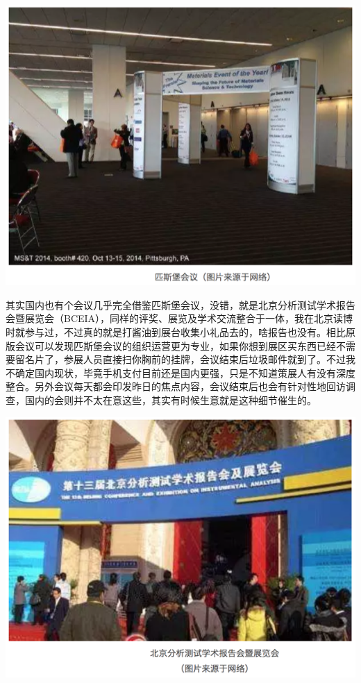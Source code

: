 \documentclass[]{book}
\begin{document}
\includegraphics[width=8.33in]{images/pittcon2}

其实国内也有个会议几乎完全借鉴匹斯堡会议，没错，就是北京分析测试学术报告会暨展览会（BCEIA），同样的评奖、展览及学术交流整合于一体，我在北京读博时就参与过，不过真的就是打酱油到展台收集小礼品去的，啥报告也没有。相比原版会议可以发现匹斯堡会议的组织运营更为专业，如果你想到展区买东西已经不需要留名片了，参展人员直接扫你胸前的挂牌，会议结束后垃圾邮件就到了。不过我不确定国内现状，毕竟手机支付目前还是国内更强，只是不知道策展人有没有深度整合。另外会议每天都会印发昨日的焦点内容，会议结束后也会有针对性地回访调查，国内的会则并不太在意这些，其实有时候生意就是这种细节催生的。

\includegraphics[width=8.33in]{images/pittcon3}
\end{document}
